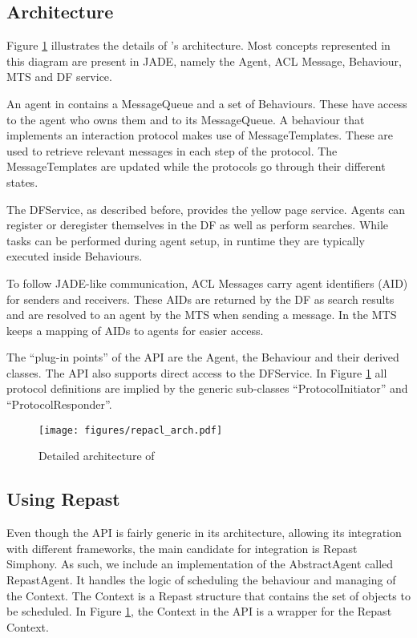 \subsection{Architecture}

Figure \ref{fig:arch} illustrates the details of \apiname{}'s architecture. Most concepts represented in this diagram are present in JADE, namely the Agent, ACL Message, Behaviour, MTS and DF service.

An agent in \apiname{} contains a MessageQueue and a set of Behaviours. These have access to the agent who owns them and to its MessageQueue. A behaviour that implements an interaction protocol makes use of MessageTemplates. These are used to retrieve relevant messages in each step of the protocol. The MessageTemplates are updated while the protocols go through their different states.

The DFService, as described before, provides the yellow page service. Agents can register or deregister themselves in the DF as well as perform searches. While tasks can be performed during agent setup, in runtime they are typically executed inside Behaviours.

To follow JADE-like communication, ACL Messages carry agent identifiers (AID) for senders and receivers. These AIDs are returned by the DF as search results and are resolved to an agent by the MTS when sending a message. In \apiname{} the MTS keeps a mapping of AIDs to agents for easier access.

The ``plug-in points'' of the API are the Agent, the Behaviour and their derived classes. The API also supports direct access to the DFService. In Figure \ref{fig:arch} all protocol definitions are implied by the generic sub-classes ``ProtocolInitiator'' and ``ProtocolResponder''. 

\begin{figure}
	\centering
	\texttt{[image: figures/repacl\_arch.pdf]}
	\caption{Detailed architecture of \apiname{}}
	\label{fig:arch}
\end{figure}

\subsection{Using Repast}

Even though the API is fairly generic in its architecture, allowing its integration with different frameworks, the main candidate for integration is Repast Simphony. As such, we include an implementation of the AbstractAgent called RepastAgent. It handles the logic of scheduling the behaviour and managing of the Context. The Context is a Repast structure that contains the set of objects to be scheduled. In Figure \ref{fig:arch}, the Context in the API is a wrapper for the Repast Context.


